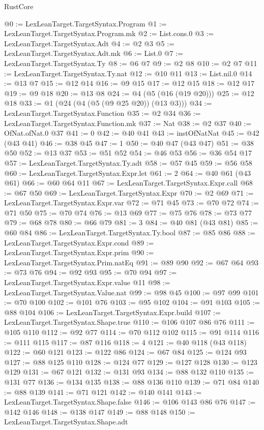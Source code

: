 \begin{lexlean}{RustCore}
\begin{coremodule}
@0 := LexLeanTarget.TargetSyntax.Program
@1 := LexLeanTarget.TargetSyntax.Program.mk
@2 := List.cons.{0}
@3 := LexLeanTarget.TargetSyntax.Adt
@4 := @2 @3
@5 := LexLeanTarget.TargetSyntax.Adt.mk
@6 := List.{0}
@7 := LexLeanTarget.TargetSyntax.Ty
@8 := @6 @7
@9 := @2 @8
@10 := @2 @7
@11 := LexLeanTarget.TargetSyntax.Ty.nat
@12 := @10 @11
@13 := List.nil.{0}
@14 := @13 @7
@15 := @12 @14
@16 := @9 @15
@17 := @12 @15
@18 := @12 @17
@19 := @9 @18
@20 := @13 @8
@24 := @4 (@5 (@16 (@19 @20)))
@25 := @12 @18
@33 := @1 (@24 (@4 (@5 (@9 @25 @20)) (@13 @3)))
@34 := LexLeanTarget.TargetSyntax.Function
@35 := @2 @34
@36 := LexLeanTarget.TargetSyntax.Function.mk
@37 := Nat
@38 := @2 @37
@40 := OfNat.ofNat.{0} @37
@41 := 0
@42 := @40 @41
@43 := instOfNatNat
@45 := @42 (@43 @41)
@46 := @38 @45
@47 := 1
@50 := @40 @47 (@43 @47)
@51 := @38 @50
@52 := @13 @37
@53 := @51 @52
@54 := @46 @53
@56 := @36 @54 @17
@57 := LexLeanTarget.TargetSyntax.Ty.adt
@58 := @57 @45
@59 := @56 @58
@60 := LexLeanTarget.TargetSyntax.Expr.let
@61 := 2
@64 := @40 @61 (@43 @61)
@66 := @60 @64 @11
@67 := LexLeanTarget.TargetSyntax.Expr.call
@68 := @67 @50
@69 := LexLeanTarget.TargetSyntax.Expr
@70 := @2 @69
@71 := LexLeanTarget.TargetSyntax.Expr.var
@72 := @71 @45
@73 := @70 @72
@74 := @71 @50
@75 := @70 @74
@76 := @13 @69
@77 := @75 @76
@78 := @73 @77
@79 := @68 @78
@80 := @66 @79
@81 := 3
@84 := @40 @81 (@43 @81)
@85 := @60 @84
@86 := LexLeanTarget.TargetSyntax.Ty.bool
@87 := @85 @86
@88 := LexLeanTarget.TargetSyntax.Expr.cond
@89 := LexLeanTarget.TargetSyntax.Expr.prim
@90 := LexLeanTarget.TargetSyntax.Prim.natEq
@91 := @89 @90
@92 := @67 @64
@93 := @73 @76
@94 := @92 @93
@95 := @70 @94
@97 := LexLeanTarget.TargetSyntax.Expr.value @11
@98 := LexLeanTarget.TargetSyntax.Value.nat
@99 := @98 @45
@100 := @97 @99
@101 := @70 @100
@102 := @101 @76
@103 := @95 @102
@104 := @91 @103
@105 := @88 @104
@106 := LexLeanTarget.TargetSyntax.Expr.build
@107 := LexLeanTarget.TargetSyntax.Shape.true
@110 := @106 @107 @86 @76
@111 := @105 @110
@112 := @92 @77
@114 := @70 @112 @102
@115 := @91 @114
@116 := @111 @115
@117 := @87 @116
@118 := 4
@121 := @40 @118 (@43 @118)
@122 := @60 @121
@123 := @122 @86
@124 := @67 @84
@125 := @124 @93
@127 := @88 @125 @110
@128 := @124 @77
@129 := @127 @128
@130 := @123 @129
@131 := @67 @121
@132 := @131 @93
@134 := @88 @132 @110
@135 := @131 @77
@136 := @134 @135
@138 := @88 @136 @110
@139 := @71 @84
@140 := @88 @139
@141 := @71 @121
@142 := @140 @141
@143 := LexLeanTarget.TargetSyntax.Shape.false
@146 := @106 @143 @86 @76
@147 := @142 @146
@148 := @138 @147
@149 := @88 @148
@150 := LexLeanTarget.TargetSyntax.Shape.adt

\end{coremodule}
\end{lexlean}
